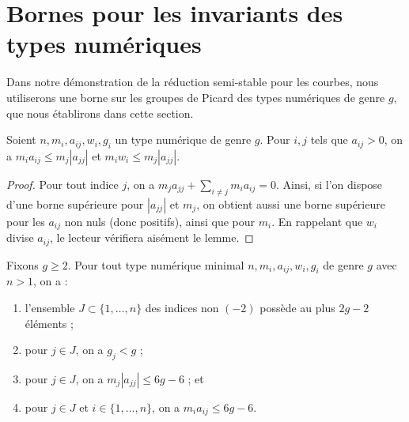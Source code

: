 \section{Bornes pour les invariants des types numériques}
\label{section-towards-classification}

\noindent
Dans notre démonstration de la réduction semi-stable pour les courbes, nous utiliserons une borne
sur les groupes de Picard des types numériques de genre $g$, que nous établirons
dans cette section.

\begin{lemma}
\label{lemma-bound-neighbours}
Soient $n, m_i, a_{ij}, w_i, g_i$ un type numérique de genre $g$.
Pour $i, j$ tels que $a_{ij} > 0$, on a
$m_ia_{ij} \leq m_j|a_{jj}|$ et $m_iw_i \leq m_j|a_{jj}|$.
\end{lemma}

\begin{proof}
Pour tout indice $j$, on a $m_j a_{jj} + \sum_{i \not = j} m_ia_{ij} = 0$.
Ainsi, si l'on dispose d'une borne supérieure pour $|a_{jj}|$ et $m_j$, on obtient aussi une
borne supérieure pour les $a_{ij}$ non nuls (donc positifs), ainsi que pour
$m_i$. En rappelant que $w_i$ divise $a_{ij}$, le lecteur vérifiera aisément
le lemme.
\end{proof}

\begin{lemma}
\label{lemma-bound-heart}
Fixons $g \geq 2$. Pour tout type numérique minimal $n, m_i, a_{ij}, w_i, g_i$
de genre $g$ avec $n > 1$, on a :
\begin{enumerate}
\item l'ensemble $J \subset \{1, \ldots, n\}$ des indices non $(-2)$
possède au plus $2g - 2$ éléments ;
\item pour $j \in J$, on a $g_j < g$ ;
\item pour $j \in J$, on a $m_j|a_{jj}| \leq 6g - 6$ ; et
\item pour $j \in J$ et $i \in \{1, \ldots, n\}$,
on a $m_ia_{ij} \leq 6g - 6$.
\end{enumerate}
\end{lemma}

